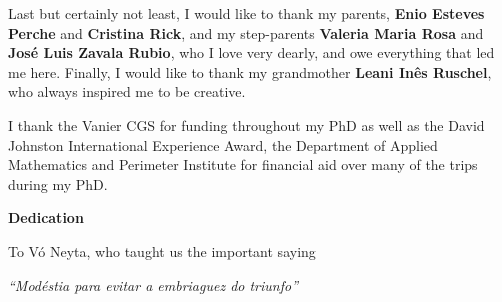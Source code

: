 \documentclass[letterpaper,12pt,titlepage,oneside,final]{book}
\let\origdoublepage\cleardoublepage
\newcommand{\clearemptydoublepage}{%
  \clearpage{\pagestyle{empty}\origdoublepage}}
\let\cleardoublepage\clearemptydoublepage
\begin{document}
Last but certainly not least, I would like to thank my parents, \textbf{Enio Esteves Perche} and \textbf{Cristina Rick}, and my step-parents \textbf{Valeria Maria Rosa} and \textbf{José Luis Zavala Rubio}, who I love very dearly, and owe everything that led me here. Finally, I would like to thank my grandmother \textbf{Leani Inês Ruschel}, who always inspired me to be creative.

I thank the Vanier CGS for funding throughout my PhD as well as the David Johnston International Experience Award, the Department of Applied Mathematics and Perimeter Institute for financial aid over many of the trips during my PhD.




\cleardoublepage
{}    %

\begin{center}\textbf{Dedication}\end{center}

To Vó Neyta, who taught us the important saying\\

\begin{center} \textit{``Modéstia para evitar a embriaguez do triunfo''}\end{center}


\cleardoublepage
{}    %

\renewcommand\contentsname{Table of Contents}
\tableofcontents
\cleardoublepage
{}    %

\cleardoublepage
{}    %


\listoffigures
\cleardoublepage
{}		%


\listoftables
\cleardoublepage
{}		%
\end{document}
